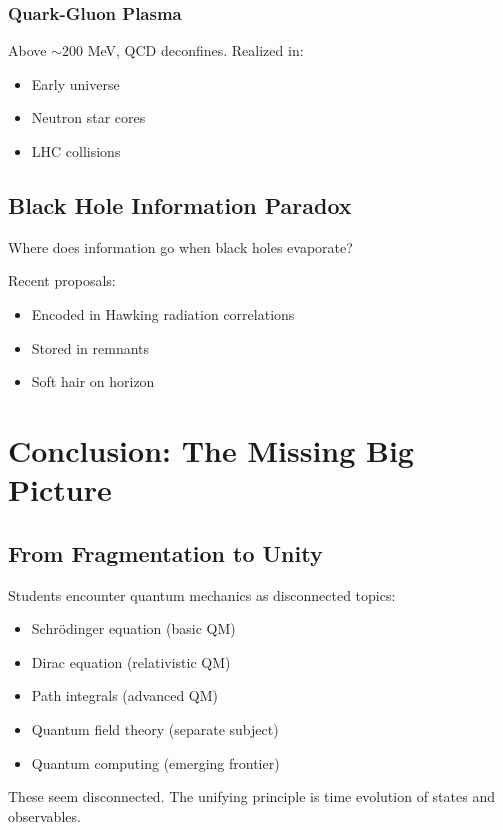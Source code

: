 \documentclass[12pt,oneside]{book}
\begin{document}
\subsection{Quark-Gluon Plasma}

Above $\sim 200$ MeV, QCD deconfines. Realized in:
\begin{itemize}
  \item Early universe
  \item Neutron star cores
  \item LHC collisions
\end{itemize}

\section{Black Hole Information Paradox}

Where does information go when black holes evaporate?

Recent proposals:
\begin{itemize}
  \item Encoded in Hawking radiation correlations
  \item Stored in remnants
  \item Soft hair on horizon
\end{itemize}

\chapter{Conclusion: The Missing Big Picture}

\section{From Fragmentation to Unity}

Students encounter quantum mechanics as disconnected topics:
\begin{itemize}
  \item Schrödinger equation (basic QM)
  \item Dirac equation (relativistic QM)
  \item Path integrals (advanced QM)
  \item Quantum field theory (separate subject)
  \item Quantum computing (emerging frontier)
\end{itemize}

These seem disconnected. The unifying principle is time evolution of states and observables.
\end{document}
